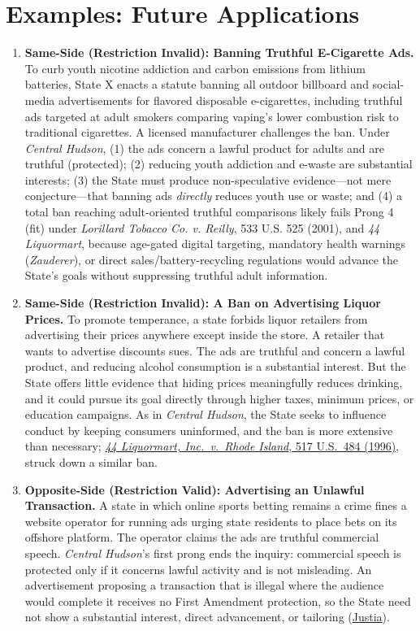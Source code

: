 \documentclass[12pt]{article}
\begin{document}
\section{Examples: Future Applications}
\begin{enumerate}

\item \textbf{Same-Side (Restriction Invalid): Banning Truthful E-Cigarette Ads.} To curb youth nicotine addiction and carbon emissions from lithium batteries, State X enacts a statute banning all outdoor billboard and social-media advertisements for flavored disposable e-cigarettes, including truthful ads targeted at adult smokers comparing vaping's lower combustion risk to traditional cigarettes. A licensed manufacturer challenges the ban. Under \textit{Central Hudson}, (1) the ads concern a lawful product for adults and are truthful (protected); (2) reducing youth addiction and e-waste are substantial interests; (3) the State must produce non-speculative evidence---not mere conjecture---that banning ads \emph{directly} reduces youth use or waste; and (4) a total ban reaching adult-oriented truthful comparisons likely fails Prong 4 (fit) under \textit{Lorillard Tobacco Co. v. Reilly}, 533 U.S. 525 (2001), and \textit{44 Liquormart}, because age-gated digital targeting, mandatory health warnings (\textit{Zauderer}), or direct sales/battery-recycling regulations would advance the State's goals without suppressing truthful adult information.

\item \textbf{Same-Side (Restriction Invalid): A Ban on Advertising Liquor Prices.} To promote temperance, a state forbids liquor retailers from advertising their prices anywhere except inside the store. A retailer that wants to advertise discounts sues. The ads are truthful and concern a lawful product, and reducing alcohol consumption is a substantial interest. But the State offers little evidence that hiding prices meaningfully reduces drinking, and it could pursue its goal directly through higher taxes, minimum prices, or education campaigns. As in \textit{Central Hudson}, the State seeks to influence conduct by keeping consumers uninformed, and the ban is more extensive than necessary; \href{https://supreme.justia.com/cases/federal/us/517/484/}{\textit{44 Liquormart, Inc.\ v.\ Rhode Island}, 517 U.S.\ 484 (1996)}, struck down a similar ban.

\item \textbf{Opposite-Side (Restriction Valid): Advertising an Unlawful Transaction.} A state in which online sports betting remains a crime fines a website operator for running ads urging state residents to place bets on its offshore platform. The operator claims the ads are truthful commercial speech. \textit{Central Hudson}'s first prong ends the inquiry: commercial speech is protected only if it concerns lawful activity and is not misleading. An advertisement proposing a transaction that is illegal where the audience would complete it receives no First Amendment protection, so the State need not show a substantial interest, direct advancement, or tailoring (\href{https://supreme.justia.com/cases/federal/us/447/557/}{Justia}).


\end{enumerate}
\end{document}
